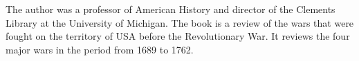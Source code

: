 
The author was a professor of American History and director of the Clements
Library at the University of Michigan. The book is a review of the wars that
were fought on the territory of USA before the Revolutionary War. It reviews
the four major wars in the period from 1689 to 1762.%
